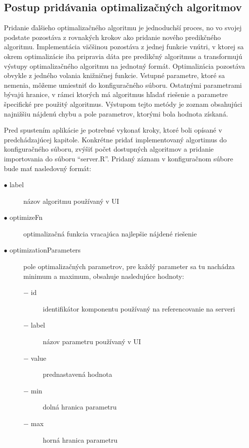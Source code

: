 \documentclass[a4paper,slovak,12pt,appendix]{article}
\begin{document}

\subsection{Postup pridávania optimalizačných algoritmov}
Pridanie ďalšieho optimalizačného algoritmu je jednoduchší proces, no vo
svojej podstate pozostáva z rovnakých krokov ako pridanie nového predikčného
algoritmu. Implementácia väčšinou pozostáva z jednej funkcie vnútri, v ktorej sa
okrem optimalizácie iba pripravia dáta pre predikčný algoritmus a transformujú
výstupy optimalizačného algoritmu na jednotný formát. Optimalizácia pozostáva
obvykle z jedného volania knižničnej funkcie. Vstupné parametre, ktoré sa
nemenia, môžeme umiestniť do konfiguračného súboru. Ostatnými parametrami bývajú
hranice, v rámci ktorých má algoritmus hľadať riešenie a parametre špecifické
pre použitý algoritmus. Výstupom tejto metódy je zoznam obsahujúci najnižšiu
nájdenú chybu a pole parametrov, ktorými bola hodnota získaná.

Pred spustením aplikácie je potrebné vykonať kroky, ktoré boli opísané
v predchádzajúcej kapitole. Konkrétne pridať implementovaný algortimus do
konfiguračného súboru, zvýšiť počet dostupných algoritmov a pridanie
importovania do súboru ``server.R''. Pridaný záznam v konfiguračnom súbore
bude mať nasledovný formát:
\begin{description}
  \item[$\bullet$ label] názov algoritmu používaný v UI
  \item[$\bullet$ optimizeFn] optimalizačná funkcia vracajúca najlepšie nájdené riešenie
  \item[$\bullet$ optimizationParameters] pole optimalizačných parametrov, pre každý parameter sa
  tu nachádza minimum a maximum, obsahuje nasledujúce hodnoty:
  \begin{description}
    \item[$-$ id] identifikátor komponentu používaný na referencovanie na serveri
    \item[$-$ label] názov parametru používaný v UI
    \item[$-$ value] prednastavená hodnota
    \item[$-$ min] dolná hranica parametru
    \item[$-$ max] horná hranica parametru
  \end{description}
\end{description}
\end{document}
